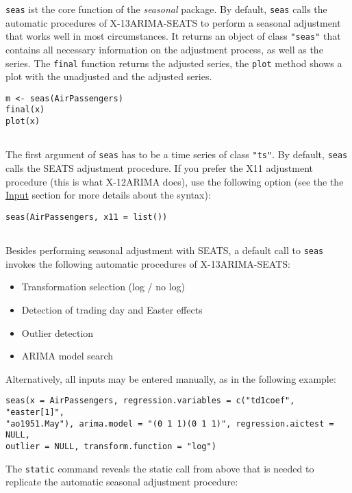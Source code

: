 \texttt{seas} ist the core function of the \emph{seasonal} package. By
default, \texttt{seas} calls the automatic procedures of X-13ARIMA-SEATS
to perform a seasonal adjustment that works well in most circumstances.
It returns an object of class \texttt{"seas"} that contains all
necessary information on the adjustment process, as well as the series.
The \texttt{final} function returns the adjusted series, the
\texttt{plot} method shows a plot with the unadjusted and the adjusted
series.

\begin{verbatim}
m <- seas(AirPassengers)
final(x)
plot(x)
 
\end{verbatim}

The first argument of \texttt{seas} has to be a time series of class
\texttt{"ts"}. By default, \texttt{seas} calls the SEATS adjustment
procedure. If you prefer the X11 adjustment procedure (this is what
X-12ARIMA does), use the following option (see the the
\hyperref[input]{Input} section for more details about the syntax):

\begin{verbatim}
seas(AirPassengers, x11 = list())
 
\end{verbatim}

Besides performing seasonal adjustment with SEATS, a default call to
\texttt{seas} invokes the following automatic procedures of
X-13ARIMA-SEATS:

\begin{itemize}
\itemsep1pt\parskip0pt
\item
  Transformation selection (log / no log)
\item
  Detection of trading day and Easter effects
\item
  Outlier detection
\item
  ARIMA model search
\end{itemize}

Alternatively, all inputs may be entered manually, as in the following
example:

\begin{verbatim}
seas(x = AirPassengers, regression.variables = c("td1coef", "easter[1]",
"ao1951.May"), arima.model = "(0 1 1)(0 1 1)", regression.aictest = NULL,
outlier = NULL, transform.function = "log")
\end{verbatim}

The \texttt{static} command reveals the static call from above that is
needed to replicate the automatic seasonal adjustment procedure:

